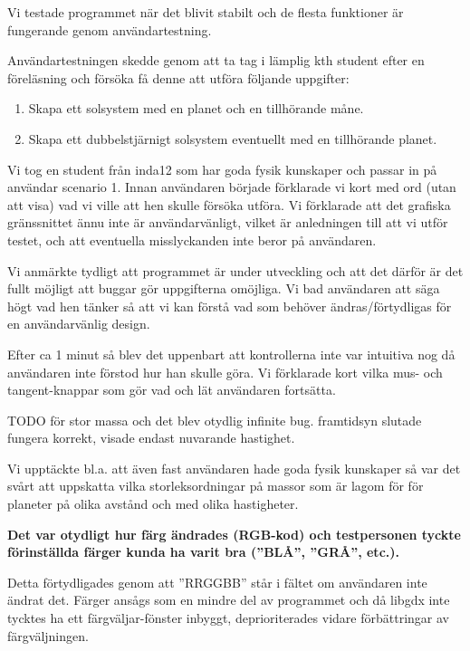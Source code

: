 Vi testade programmet när det blivit stabilt och de flesta funktioner
är fungerande genom användartestning.

Användartestningen skedde genom att ta tag i lämplig kth student efter
en föreläsning och försöka få denne att utföra följande uppgifter:
\begin{enumerate}
    \item Skapa ett solsystem med en planet och en tillhörande måne.
    \item Skapa ett dubbelstjärnigt solsystem eventuellt med
        en tillhörande planet.
\end{enumerate}

Vi tog en student från inda12 som har goda fysik kunskaper
och passar in på användar scenario 1.
Innan användaren började förklarade vi kort med ord (utan att visa)
vad vi ville att hen skulle försöka utföra.
Vi förklarade att det grafiska gränssnittet ännu inte är användarvänligt,
vilket är anledningen till att vi utför testet, och att eventuella
misslyckanden inte beror på användaren.

Vi anmärkte tydligt att programmet är under utveckling och
att det därför är det fullt möjligt att buggar gör uppgifterna omöjliga.
Vi bad användaren att säga högt vad hen tänker så att vi kan förstå vad som
behöver ändras/förtydligas för en användarvänlig design.

Efter ca 1 minut så blev det uppenbart att kontrollerna inte var
intuitiva nog då användaren inte förstod hur han skulle göra.
Vi förklarade kort vilka mus- och tangent-knappar som gör vad och
lät användaren fortsätta.

TODO
för stor massa och det blev otydlig infinite bug.
framtidsyn slutade fungera korrekt, visade endast nuvarande hastighet.

Vi upptäckte bl.a. att även fast användaren hade goda fysik kunskaper så
var det svårt att uppskatta vilka storleksordningar på massor som är
lagom för för planeter på olika avstånd och med olika hastigheter.




\vspace{6pt}

\textbf{Det var otydligt hur färg ändrades (RGB-kod) och testpersonen
tyckte förinställda färger kunda ha varit bra (''BLÅ'', ''GRÅ'', etc.).}

Detta förtydligades genom att ''RRGGBB'' står i fältet om användaren inte
ändrat det. Färger ansågs som en mindre del av programmet och
då libgdx inte tycktes ha ett färgväljar-fönster inbyggt, deprioriterades
vidare förbättringar av färgväljningen.

